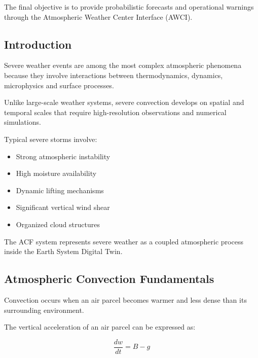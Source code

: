 The final objective is to provide probabilistic forecasts and
operational warnings through the Atmospheric Weather Center Interface
(AWCI).


\subsection{Introduction}

Severe weather events are among the most complex atmospheric phenomena
because they involve interactions between thermodynamics, dynamics,
microphysics and surface processes.

Unlike large-scale weather systems, severe convection develops on
spatial and temporal scales that require high-resolution observations
and numerical simulations.

Typical severe storms involve:

\begin{itemize}

\item Strong atmospheric instability

\item High moisture availability

\item Dynamic lifting mechanisms

\item Significant vertical wind shear

\item Organized cloud structures

\end{itemize}

The ACF system represents severe weather as a coupled atmospheric
process inside the Earth System Digital Twin.


\subsection{Atmospheric Convection Fundamentals}

Convection occurs when an air parcel becomes warmer and less dense than
its surrounding environment.

The vertical acceleration of an air parcel can be expressed as:

\[
\frac{dw}{dt}=B-g
\]

